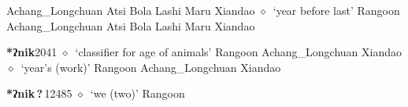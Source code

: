 \begin{list}{}{\leftmargin=1.5em \itemindent=-1.5em}
\hspace{1ex}
         Achang\_Longchuan 
\hspace{1ex}
         Atsi 
\hspace{1ex}
         Bola 
\hspace{1ex}
         Lashi 
\hspace{1ex}
         Maru 
\hspace{1ex}
         Xiandao 
\hspace{1ex}
         $\diamond$~`year before last'
         Rangoon 
\hspace{1ex}
         Achang\_Longchuan 
\hspace{1ex}
         Atsi 
\hspace{1ex}
         Bola 
\hspace{1ex}
         Lashi 
\hspace{1ex}
         Maru 
\hspace{1ex}
         Xiandao 
  \item {\footnotesize \textbf{*ʔnik}}{\tiny 2041}
\hspace{1ex}
         $\diamond$~`classifier for age of animals'
         Rangoon 
\hspace{1ex}
         Achang\_Longchuan 
\hspace{1ex}
         Xiandao 
\hspace{1ex}
         $\diamond$~`year's (work)'
         Rangoon 
\hspace{1ex}
         Achang\_Longchuan 
\hspace{1ex}
         Xiandao 
  \item {\footnotesize \textbf{*ʔnik\,?\,}}{\tiny 12485}
\hspace{1ex}
         $\diamond$~`we (two)'
         Rangoon 

\end{list}
